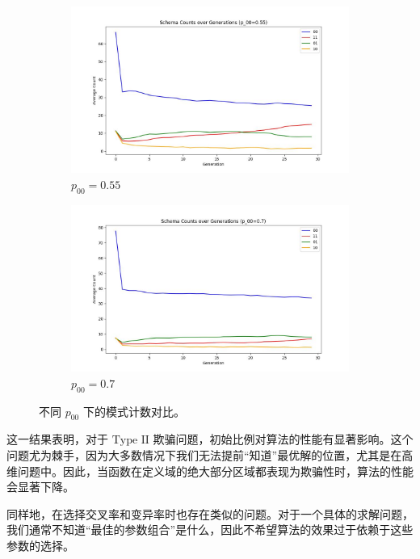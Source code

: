 \documentclass[journal=gmj]{report}%
\theoremstyle{definition}
\numberwithin{equation}{section}
\begin{document}
\begin{figure}[H]
    \begin{subfigure}[b]{0.45\textwidth}
        \centering
        \includegraphics[width=\textwidth]{../assets/img/popnum_with_p00_0.55}
        \caption{\( p_{00} = 0.55 \)}
    \end{subfigure}
    \hfill
    \begin{subfigure}[b]{0.45\textwidth}
        \centering
        \includegraphics[width=\textwidth]{../assets/img/popnum_with_p00_0.7}
        \caption{\( p_{00} = 0.7 \)}
    \end{subfigure}
    
    \caption{不同 \( p_{00} \) 下的模式计数对比。}
    \label{fig:schema_counts}
\end{figure}

这一结果表明，对于 $\text{Type II}$ 欺骗问题，初始比例对算法的性能有显著影响。这个问题尤为棘手，因为大多数情况下我们无法提前“知道”最优解的位置，尤其是在高维问题中。因此，当函数在定义域的绝大部分区域都表现为欺骗性时，算法的性能会显著下降。

同样地，在选择交叉率和变异率时也存在类似的问题。对于一个具体的求解问题，我们通常不知道“最佳的参数组合”是什么，因此不希望算法的效果过于依赖于这些参数的选择。
\end{document}
